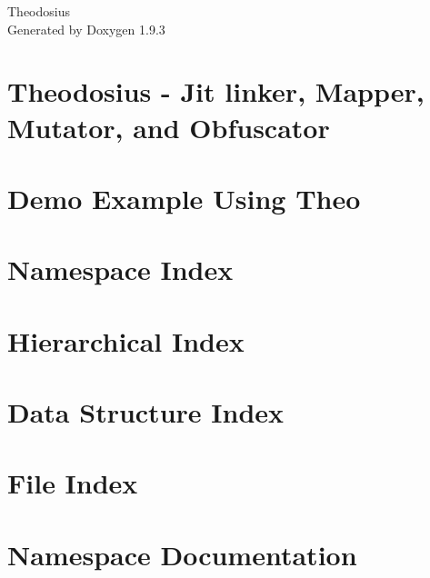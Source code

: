 \documentclass[twoside]{book}
\newcommand{\+}{\discretionary{\mbox{\scriptsize$\hookleftarrow$}}{}{}}
\newcommand{\clearemptydoublepage}{%
    \newpage{\pagestyle{empty}\cleardoublepage}%
  }
\begin{document}
  \raggedbottom
    \hypersetup{pageanchor=false,
                bookmarksnumbered=true,
                pdfencoding=unicode
               }
  \begin{titlepage}
  \vspace*{7cm}
  \begin{center}%
  {\Large Theodosius}\\
  \vspace*{1cm}
  {\large Generated by Doxygen 1.9.3}\\
  \end{center}
  \end{titlepage}
  \clearemptydoublepage
  \tableofcontents
  \clearemptydoublepage
  \hypersetup{pageanchor=true}
\chapter{Theodosius -\/ Jit linker, Mapper, Mutator, and Obfuscator}
\label{index}\hypertarget{index}{}
\chapter{Demo Example Using Theo}
\label{md_examples_demo__demo__example__using__theo}

\chapter{Namespace Index}

\chapter{Hierarchical Index}

\chapter{Data Structure Index}

\chapter{File Index}

\chapter{Namespace Documentation}





\end{document}
